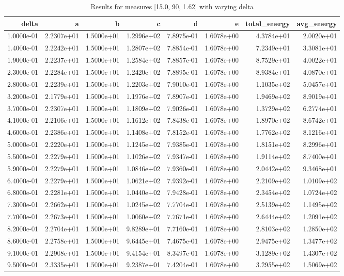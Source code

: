 \begin{table}
\caption{Results for measures [15.0, 90, 1.62] with varying delta}
\label{tab:results_15.0_90_1.62}
\begin{tabular}{rrrrrrrr}
\toprule
delta & a & b & c & d & e & total_energy & avg_energy \\
\midrule
1.0000e-01 & 2.2307e+01 & 1.5000e+01 & 1.2996e+02 & 7.8975e-01 & 1.6078e+00 & 4.3784e+01 & 2.0020e+01 \\
1.4000e-01 & 2.2242e+01 & 1.5000e+01 & 1.2807e+02 & 7.8854e-01 & 1.6078e+00 & 7.2349e+01 & 3.3081e+01 \\
1.9000e-01 & 2.2237e+01 & 1.5000e+01 & 1.2584e+02 & 7.8857e-01 & 1.6078e+00 & 8.7529e+01 & 4.0022e+01 \\
2.3000e-01 & 2.2284e+01 & 1.5000e+01 & 1.2420e+02 & 7.8895e-01 & 1.6078e+00 & 8.9384e+01 & 4.0870e+01 \\
2.8000e-01 & 2.2239e+01 & 1.5000e+01 & 1.2203e+02 & 7.9010e-01 & 1.6078e+00 & 1.1035e+02 & 5.0457e+01 \\
3.2000e-01 & 2.1779e+01 & 1.5000e+01 & 1.1976e+02 & 7.8907e-01 & 1.6078e+00 & 1.9469e+02 & 8.9019e+01 \\
3.7000e-01 & 2.2307e+01 & 1.5000e+01 & 1.1809e+02 & 7.9026e-01 & 1.6078e+00 & 1.3729e+02 & 6.2774e+01 \\
4.1000e-01 & 2.2106e+01 & 1.5000e+01 & 1.1612e+02 & 7.8438e-01 & 1.6078e+00 & 1.8970e+02 & 8.6742e+01 \\
4.6000e-01 & 2.2386e+01 & 1.5000e+01 & 1.1408e+02 & 7.8152e-01 & 1.6078e+00 & 1.7762e+02 & 8.1216e+01 \\
5.0000e-01 & 2.2220e+01 & 1.5000e+01 & 1.1245e+02 & 7.9385e-01 & 1.6078e+00 & 1.8151e+02 & 8.2996e+01 \\
5.5000e-01 & 2.2279e+01 & 1.5000e+01 & 1.1026e+02 & 7.9347e-01 & 1.6078e+00 & 1.9114e+02 & 8.7400e+01 \\
5.9000e-01 & 2.2279e+01 & 1.5000e+01 & 1.0846e+02 & 7.9360e-01 & 1.6078e+00 & 2.0442e+02 & 9.3468e+01 \\
6.4000e-01 & 2.2279e+01 & 1.5000e+01 & 1.0621e+02 & 7.9392e-01 & 1.6078e+00 & 2.2109e+02 & 1.0109e+02 \\
6.8000e-01 & 2.2281e+01 & 1.5000e+01 & 1.0440e+02 & 7.9428e-01 & 1.6078e+00 & 2.3454e+02 & 1.0724e+02 \\
7.3000e-01 & 2.2662e+01 & 1.5000e+01 & 1.0245e+02 & 7.7704e-01 & 1.6078e+00 & 2.5139e+02 & 1.1495e+02 \\
7.7000e-01 & 2.2673e+01 & 1.5000e+01 & 1.0060e+02 & 7.7671e-01 & 1.6078e+00 & 2.6444e+02 & 1.2091e+02 \\
8.2000e-01 & 2.2704e+01 & 1.5000e+01 & 9.8289e+01 & 7.7160e-01 & 1.6078e+00 & 2.8103e+02 & 1.2850e+02 \\
8.6000e-01 & 2.2758e+01 & 1.5000e+01 & 9.6445e+01 & 7.4675e-01 & 1.6078e+00 & 2.9475e+02 & 1.3477e+02 \\
9.1000e-01 & 2.2908e+01 & 1.5000e+01 & 9.4154e+01 & 8.3497e-01 & 1.6078e+00 & 3.1289e+02 & 1.4307e+02 \\
9.5000e-01 & 2.3335e+01 & 1.5000e+01 & 9.2387e+01 & 7.4204e-01 & 1.6078e+00 & 3.2955e+02 & 1.5069e+02 \\
\bottomrule
\end{tabular}
\end{table}
